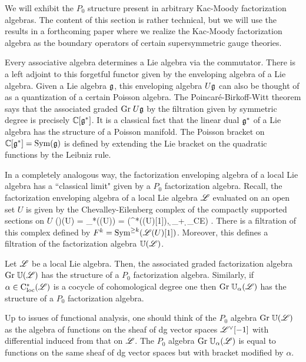 \documentclass[10pt]{amsart}
\begin{document}
We will exhibit the $P_0$ structure present in arbitrary Kac-Moody factorization algebras. 
The content of this section is rather technical, but we will use the results in a forthcoming paper where we realize the Kac-Moody factorization algebra as the boundary operators of certain supersymmetric gauge theories.
 
Every associative algebra determines a Lie algebra via the commutator. 
There is a left adjoint to this forgetful functor given by the enveloping algebra of a Lie algebra. 
Given a Lie algebra $\mathfrak g$, this enveloping algebra $U \mathfrak g$ can also be thought of as a quantization of a certain Poisson algebra.
The Poincar\'{e}-Birkoff-Witt theorem says that the associated graded ${\rm Gr} \; U \mathfrak g$ by the filtration given by symmetric degree is precisely $\mathbb C[\mathfrak g^*]$.
It is a classical fact that the linear dual $\mathfrak g^*$ of a Lie algebra has the structure of a Poisson manifold. 
The Poisson bracket on $\mathbb C[\mathfrak g^*] = {\rm Sym}(\mathfrak g)$ is defined by extending the Lie bracket on the quadratic functions by the Leibniz rule. 

In a completely analogous way, the factorization enveloping algebra of a local Lie algebra has a ``classical limit" given by a $P_0$ factorization algebra. 
Recall, the factorization enveloping algebra of a local Lie algebra $\mathscr L$ evaluated on an open set $U$ is given by the Chevalley-Eilenberg complex of the compactly supported sections on $U$
\ben
\UU(\sL)(U) = \clieu_*(\sL(U)) = \left(\Sym^*(\sL(U)[1]), \d_\sL + \d_{CE}\right) .
\een
There is a filtration of this complex defined by $F^k = {\rm Sym}^{\geq k} (\mathscr L (U)[1])$. 
Moreover, this defines a filtration of the factorization algebra $\mathbb U(\mathscr L)$. 

\begin{lem} Let $\mathscr L$ be a local Lie algebra. 
Then, the associated graded factorization algebra ${\rm Gr} \; \mathbb U(\mathscr L)$ has the structure of a $P_0$ factorization algebra. 
Similarly, if $\alpha \in {\rm C}_{\rm loc}^*(\mathscr L)$ is a cocycle of cohomological degree one then ${\rm Gr} \; \mathbb U_\alpha(\mathscr L)$ has the structure of a $P_0$ factorization algebra.
\end{lem}

Up to issues of functional analysis, one should think of the $P_0$ algebra ${\rm Gr} \; \mathbb U(\mathscr L)$ as the algebra of functions on the sheaf of dg vector spaces $\mathscr L^\vee [-1]$ with differential induced from that on $\mathscr L$. 
The $P_0$ algebra ${\rm Gr} \; \mathbb U_\alpha(\mathscr L)$ is equal to functions on the same sheaf of dg vector spaces but with bracket modified by $\alpha$. 
\end{document}
